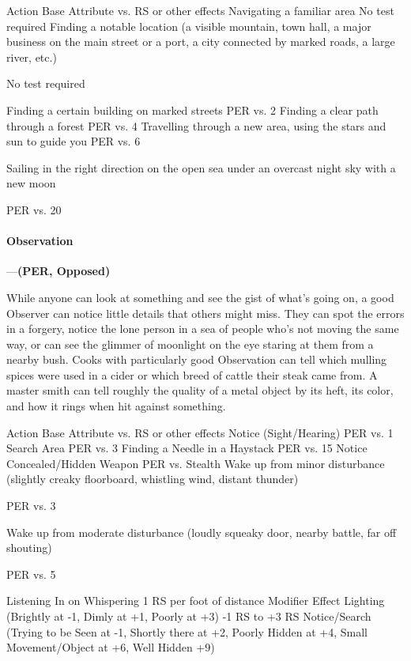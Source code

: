 \documentclass[oneside,11pt,english]{book}
\begin{document}
Action Base Attribute vs. RS 
or other effects 
Navigating a familiar area No test required 
Finding a notable location (a visible mountain, town hall, a major business on 
the main street or a port, a city connected by marked roads, a large river, etc.) 

No test required 

Finding a certain building on marked streets PER vs. 2 
Finding a clear path through a forest PER vs. 4 
Travelling through a new area, using the stars and sun to guide you PER vs. 6 


Sailing in the right direction on the open sea under an overcast night sky with a 
new moon 

PER vs. 20 

 

 

\paragraph{\label{skill:Observation}Observation}---\quad\textbf{(PER, Opposed) }\par
While anyone can look at something and see the gist of what’s going on, a good Observer can notice little details that others might miss. They can spot the errors in a forgery, notice the lone person in a sea of people who’s not moving the same way, or can see the glimmer of moonlight on the eye staring at them from a nearby bush. Cooks with particularly good Observation can tell which mulling spices were used in a cider or which breed of cattle their steak came from. A master smith can tell roughly the quality of a metal object by its heft, its color, and how it rings when hit against something.


Action Base Attribute vs. RS 
or other effects 
Notice (Sight/Hearing) PER vs. 1 
Search Area PER vs. 3 
Finding a Needle in a Haystack PER vs. 15 
Notice Concealed/Hidden Weapon PER vs. Stealth 
Wake up from minor disturbance (slightly creaky floorboard, whistling wind, 
distant thunder) 

PER vs. 3 

Wake up from moderate disturbance (loudly squeaky door, nearby battle, far 
off shouting) 

PER vs. 5 

Listening In on Whispering 1 RS per foot of distance 
Modifier Effect 
Lighting (Brightly at -1, Dimly at +1, Poorly at +3) -1 RS to +3 RS 
Notice/Search (Trying to be Seen at -1, Shortly there at +2, Poorly Hidden at 
+4, Small Movement/Object at +6, Well Hidden +9) 
\end{document}
